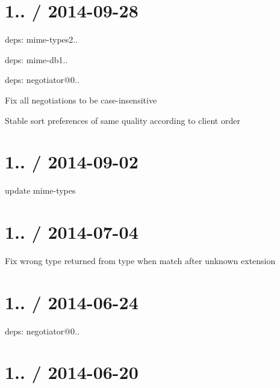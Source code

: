 \section*{1.. / 2014-\/09-\/28 }


\begin{DoxyItemize}
\item deps\+: mime-\/types2..
\begin{DoxyItemize}
\item deps\+: mime-\/db1..
\end{DoxyItemize}
\item deps\+: negotiator@0..
\begin{DoxyItemize}
\item Fix all negotiations to be case-\/insensitive
\item Stable sort preferences of same quality according to client order
\end{DoxyItemize}
\end{DoxyItemize}

\section*{1.. / 2014-\/09-\/02 }


\begin{DoxyItemize}
\item update {\ttfamily mime-\/types}
\end{DoxyItemize}

\section*{1.. / 2014-\/07-\/04 }


\begin{DoxyItemize}
\item Fix wrong type returned from {\ttfamily type} when match after unknown extension
\end{DoxyItemize}

\section*{1.. / 2014-\/06-\/24 }


\begin{DoxyItemize}
\item deps\+: negotiator@0..
\end{DoxyItemize}

\section*{1.. / 2014-\/06-\/20 }


